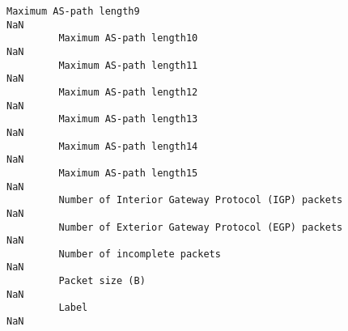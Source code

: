 \documentclass[11pt]{article}
\begin{document}
\begin{Verbatim}[commandchars=\\\{\}]
         Maximum AS-path length9                                               NaN   
         Maximum AS-path length10                                              NaN   
         Maximum AS-path length11                                              NaN   
         Maximum AS-path length12                                              NaN   
         Maximum AS-path length13                                              NaN   
         Maximum AS-path length14                                              NaN   
         Maximum AS-path length15                                              NaN   
         Number of Interior Gateway Protocol (IGP) packets                     NaN   
         Number of Exterior Gateway Protocol (EGP) packets                     NaN   
         Number of incomplete packets                                          NaN   
         Packet size (B)                                                       NaN   
         Label                                                                 NaN   
         

\end{Verbatim}
\end{document}
